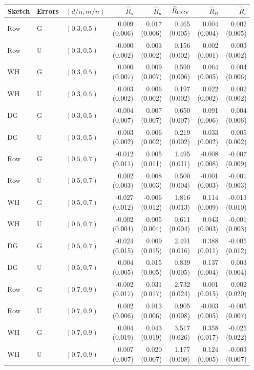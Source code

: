 \begin{tabular}{@{}lllrrrrr@{}}
\toprule
Sketch & Errors & $(d/n,m/n)$ & $\widehat R_o$ & $\widehat R_u$ & $\widehat R_{\rm GCV}$ & $\widehat R_B$ & $\widehat R_c$ \\
\midrule
Row & G & $(0.3,0.5)$ & 0.009 (0.006) & 0.017 (0.006) & 0.465 (0.005) & 0.004 (0.004) & 0.002 (0.005) \\
Row & U & $(0.3,0.5)$ & -0.000 (0.002) & 0.003 (0.002) & 0.156 (0.002) & 0.002 (0.001) & 0.003 (0.002) \\
WH & G & $(0.3,0.5)$ & 0.000 (0.007) & 0.009 (0.007) & 0.590 (0.006) & 0.064 (0.005) & 0.004 (0.006) \\
WH & U & $(0.3,0.5)$ & 0.003 (0.002) & 0.006 (0.002) & 0.197 (0.002) & 0.022 (0.002) & 0.002 (0.002) \\
DG & G & $(0.3,0.5)$ & -0.004 (0.007) & 0.007 (0.007) & 0.650 (0.007) & 0.091 (0.006) & 0.004 (0.006) \\
DG & U & $(0.3,0.5)$ & 0.003 (0.002) & 0.006 (0.002) & 0.219 (0.002) & 0.033 (0.002) & 0.005 (0.002) \\
\midrule
Row & G & $(0.5,0.7)$ & -0.012 (0.011) & 0.005 (0.011) & 1.495 (0.011) & -0.008 (0.008) & -0.007 (0.009) \\
Row & U & $(0.5,0.7)$ & 0.002 (0.003) & 0.008 (0.003) & 0.500 (0.004) & -0.001 (0.003) & -0.001 (0.003) \\
WH & G & $(0.5,0.7)$ & -0.027 (0.012) & -0.006 (0.012) & 1.816 (0.013) & 0.114 (0.009) & -0.013 (0.010) \\
WH & U & $(0.5,0.7)$ & -0.002 (0.004) & 0.005 (0.004) & 0.611 (0.004) & 0.043 (0.003) & -0.001 (0.003) \\
DG & G & $(0.5,0.7)$ & -0.024 (0.015) & 0.009 (0.015) & 2.491 (0.016) & 0.388 (0.011) & -0.005 (0.012) \\
DG & U & $(0.5,0.7)$ & 0.004 (0.005) & 0.015 (0.005) & 0.839 (0.005) & 0.137 (0.004) & 0.003 (0.004) \\
\midrule
Row & G & $(0.7,0.9)$ & -0.002 (0.017) & 0.031 (0.017) & 2.732 (0.024) & 0.001 (0.015) & 0.002 (0.020) \\
Row & U & $(0.7,0.9)$ & 0.002 (0.006) & 0.013 (0.006) & 0.905 (0.008) & -0.003 (0.005) & -0.005 (0.007) \\
WH & G & $(0.7,0.9)$ & 0.004 (0.019) & 0.043 (0.019) & 3.517 (0.026) & 0.358 (0.017) & -0.025 (0.022) \\
WH & U & $(0.7,0.9)$ & 0.007 (0.007) & 0.020 (0.007) & 1.177 (0.008) & 0.124 (0.005) & -0.003 (0.007) \\

\end{tabular}
